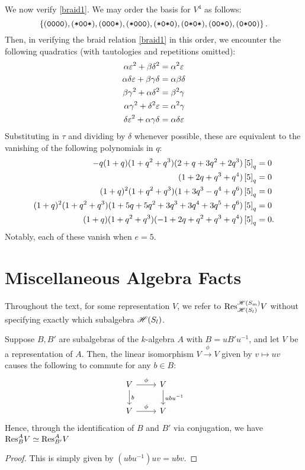 \documentclass{amsart}
\begin{document}
\vspace{7pt}
We now verify \eqref{braid1}.
We may order the basis for $V^4$ as follows:
\[
  \left\{ (\texttt{0}\texttt{0}\texttt{0}\texttt{0}),(\texttt{*}\texttt{0}\texttt{0}\texttt{*}),(\texttt{0}\texttt{0}\texttt{0}\texttt{*}),(\texttt{*}\texttt{0}\texttt{0}\texttt{0}),(\texttt{*}\texttt{0}\texttt{*}\texttt{0}),(\texttt{0}\texttt{*}\texttt{0}\texttt{*}),(\texttt{0}\texttt{0}\texttt{*}\texttt{0}),(\texttt{0}\texttt{*}\texttt{0}\texttt{0}) \right\}.
\]
Then, in verifying the braid relation \eqref{braid1} in this order, we encounter the following quadratics (with tautologies and repetitions omitted):
\begin{align*}
    \alpha\varepsilon^2 + \beta\delta^2 &= \alpha^2 \varepsilon\\
    \alpha\delta\varepsilon + \beta\gamma\delta &= \alpha\beta\delta\\
    \beta\gamma^2 + \alpha\delta^2 &= \beta^2\gamma\\
    \alpha\gamma^2 + \delta^2\varepsilon &= \alpha^2\gamma\\
    \delta\varepsilon^2 + \alpha\gamma\delta &= \alpha\delta\varepsilon
\end{align*}
Substituting in $\tau$ and dividing by $\delta$ whenever possible, these are equivalent to the vanishing of the following polynomials in $q$:
\begin{align*}
  -q (1 + q) (1 + q^2 + q^3) (2 + q + 3 q^2 + 2 q^3) \left[ 5 \right]_q &= 0\\
  (1 + 2 q + q^3 + q^4) \left[ 5 \right]_q &= 0\\
  (1+q)^2 (1+q^2+q^3) (1+3q^3 - q^4 + q^6)\left[ 5 \right]_q &= 0\\
  (1+q)^2 (1+q^2+q^3) (1+5q+5q^2+3q^3+3q^4+3q^5+q^6)\left[ 5 \right]_q &= 0\\
  (1+q) (1+q^2+q^3) (-1+2q+q^2+q^3+q^4)\left[ 5 \right]_q &= 0.
\end{align*}
Notably, each of these vanish when $e = 5$.

\section{Miscellaneous Algebra Facts}
Throughout the text, for some representation $V$, we refer to $\text{Res}_{\mathscr{H}(S_{l})}^{\mathscr{H}(S_m)} V$ without specifying exactly which subalgebra $\mathscr{H}(S_{l})$.
\begin{proposition}
  Suppose $B,B'$ are subalgebras of the $k$-algebra $A$ with $B = uB'u^{-1}$, and let $V$ be a representation of $A$.
  Then, the linear isomorphism $V \xrightarrow{\phi} V$ given by $v \mapsto uv$ causes the following to commute for any $b \in B$:
  \[
    \begin{tikzcd}
      V \arrow[r,"\phi"] \arrow[d,"b"] & V \arrow[d,"ubu^{-1}"]\\
      V \arrow[r,"\phi"] & V
    \end{tikzcd}
  \]
  Hence, through the identification of $B$ and $B'$ via conjugation, we have $\text{Res}_{B}^A V \simeq \text{Res}_{B'}^A V$
\end{proposition}
\begin{proof}
  This is simply given by $(ubu^{-1})uv = ubv$.
\end{proof}
\end{document}
